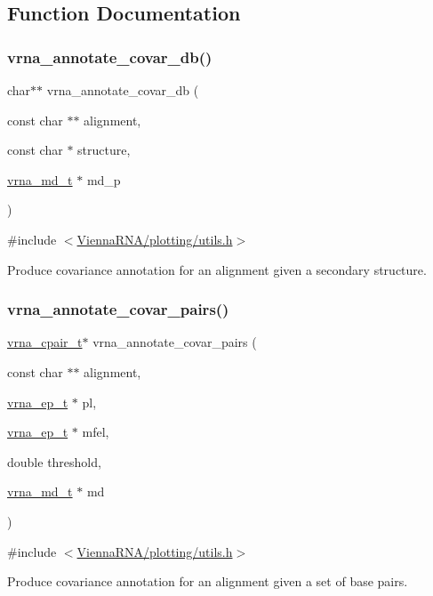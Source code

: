 \subsection{Function Documentation}
\mbox{\label{group__annotation__utils_ga01fad860df6c799264d1186c343b1d29}} 
\subsubsection{\texorpdfstring{vrna\_annotate\_covar\_db()}{vrna\_annotate\_covar\_db()}}
{\footnotesize\ttfamily char$\ast$$\ast$ vrna\+\_\+annotate\+\_\+covar\+\_\+db (\begin{DoxyParamCaption}\item[{const char $\ast$$\ast$}]{alignment,  }\item[{const char $\ast$}]{structure,  }\item[{\mbox{\hyperlink{group__model__details_ga1f8a10e12a0a1915f2a4eff0b28ea17c}{vrna\+\_\+md\+\_\+t}} $\ast$}]{md\+\_\+p }\end{DoxyParamCaption})}



{\ttfamily \#include $<$\mbox{\hyperlink{plotting_2utils_8h}{Vienna\+R\+N\+A/plotting/utils.\+h}}$>$}



Produce covariance annotation for an alignment given a secondary structure. 

\mbox{\label{group__annotation__utils_gadb9ba32197f05d5876d389b2ba92edac}} 
\subsubsection{\texorpdfstring{vrna\_annotate\_covar\_pairs()}{vrna\_annotate\_covar\_pairs()}}
{\footnotesize\ttfamily \mbox{\hyperlink{group__data__structures_gae4fc91141cc69c6d8eaf1332cb991ecc}{vrna\+\_\+cpair\+\_\+t}}$\ast$ vrna\+\_\+annotate\+\_\+covar\+\_\+pairs (\begin{DoxyParamCaption}\item[{const char $\ast$$\ast$}]{alignment,  }\item[{\mbox{\hyperlink{group__struct__utils__plist_gab9ac98ab55ded9fb90043b024b915aca}{vrna\+\_\+ep\+\_\+t}} $\ast$}]{pl,  }\item[{\mbox{\hyperlink{group__struct__utils__plist_gab9ac98ab55ded9fb90043b024b915aca}{vrna\+\_\+ep\+\_\+t}} $\ast$}]{mfel,  }\item[{double}]{threshold,  }\item[{\mbox{\hyperlink{group__model__details_ga1f8a10e12a0a1915f2a4eff0b28ea17c}{vrna\+\_\+md\+\_\+t}} $\ast$}]{md }\end{DoxyParamCaption})}



{\ttfamily \#include $<$\mbox{\hyperlink{plotting_2utils_8h}{Vienna\+R\+N\+A/plotting/utils.\+h}}$>$}



Produce covariance annotation for an alignment given a set of base pairs. 


